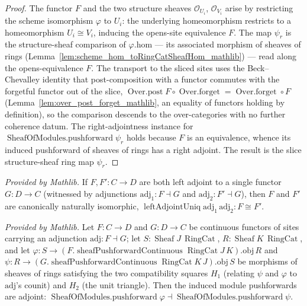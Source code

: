 \begin{proof}
  The functor \(F\) and the two structure sheaves \(\mathcal{O}_{U_i}\), \(\mathcal{O}_{V_i}\) arise by
  restricting the scheme isomorphism \(\varphi\) to \(U_i\): the underlying homeomorphism restricts to a
  homeomorphism \(U_i \cong V_i\), inducing the opens-site equivalence \(F\). The map \(\psi_r\) is the
  structure-sheaf comparison of \(\varphi.\mathrm{hom}\) — its associated morphism of sheaves of rings
  (Lemma~\ref{lem:scheme_hom_toRingCatSheafHom_mathlib}) — read along the opens-equivalence \(F\). The
  transport to the sliced sites uses the Beck--Chevalley identity that post-composition with a functor
  commutes with the forgetful functor out of the slice,
  \(\operatorname{Over.post} F \circ \operatorname{Over.forget} = \operatorname{Over.forget} \circ F\)
  (Lemma~\ref{lem:over_post_forget_mathlib}, an equality of functors holding by definition),
  so the comparison descends to the over-categories with no further coherence datum. The
  right-adjointness instance for \(\operatorname{SheafOfModules.pushforward}\psi_r\) holds because \(F\)
  is an equivalence, whence its induced pushforward of sheaves of rings has a right adjoint. The result
  is the slice structure-sheaf ring map \(\psi_r\).
\end{proof}

\begin{lemma}
  \label{lem:leftAdjointUniq_mathlib}
  \mathlibok
  \textit{Provided by Mathlib.}
  If \(F, F' : C \to D\) are both left adjoint to a single functor \(G : D \to C\) (witnessed by
  adjunctions \(\mathrm{adj}_1 : F \dashv G\) and \(\mathrm{adj}_2 : F' \dashv G\)), then \(F\) and
  \(F'\) are canonically naturally isomorphic,
  \(\operatorname{leftAdjointUniq}\mathrm{adj}_1\,\mathrm{adj}_2 : F \cong F'\).
\end{lemma}

\begin{lemma}
  \label{lem:pushforwardPushforwardAdj_mathlib}
  \mathlibok
  \textit{Provided by Mathlib.}
  Let \(F : C \to D\) and \(G : D \to C\) be continuous functors of sites carrying an adjunction
  \(\mathrm{adj} : F \dashv G\); let \(S : \operatorname{Sheaf} J\,\operatorname{RingCat}\), \(R :
  \operatorname{Sheaf} K\,\operatorname{RingCat}\), and let \(\varphi : S \to
  (F.\operatorname{sheafPushforwardContinuous} \operatorname{RingCat} J\,K).\mathrm{obj}\, R\) and
  \(\psi : R \to (G.\operatorname{sheafPushforwardContinuous} \operatorname{RingCat}
  K\,J).\mathrm{obj}\, S\) be morphisms of sheaves of rings satisfying the two compatibility squares
  \(H_1\) (relating \(\psi\) and \(\varphi\) to \(\mathrm{adj}\)'s counit) and \(H_2\) (the unit
  triangle). Then the induced module pushforwards are adjoint:
  \(\operatorname{SheafOfModules.pushforward}\varphi \dashv
  \operatorname{SheafOfModules.pushforward}\psi\).
\end{lemma}

